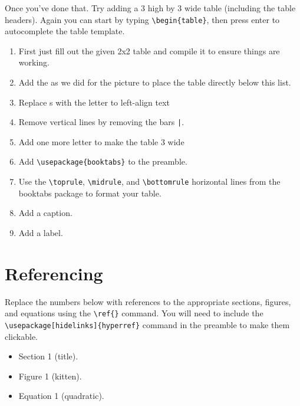     Once you've done that. Try adding a 3 high by 3 wide table (including the table headers). Again you can start by typing 
    \verb"\begin{table}", then press enter to autocomplete the table template. 
    \begin{enumerate}
        \item First just fill out the given 2x2 table and compile it to ensure things are working.
        \item Add the  as we did for the picture to place the table directly below this list.
        \item Replace s with the letter  to left-align text
        \item Remove vertical lines by removing the bars \verb"|".
        \item Add one more letter  to make the table 3 wide
        \item Add \verb"\usepackage{booktabs}" to the preamble.
        \item Use the \verb"\toprule", \verb"\midrule", and \verb"\bottomrule" horizontal lines from the booktabs package to format your table.
        \item Add a caption.
        \item Add a label.
    \end{enumerate}

    \section{Referencing}
        Replace the numbers below with references to the appropriate sections, figures, and equations using the \verb"\ref{}" command. You will need to include the \verb"\usepackage[hidelinks]{hyperref}" command in the preamble to make them clickable.

        \begin{itemize}
            \item Section 1 (title).
            \item Figure 1 (kitten).
            \item Equation 1 (quadratic).
        \end{itemize}
        

        

        
        
    


